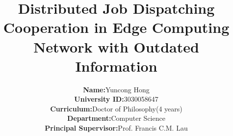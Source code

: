 \documentclass[journal, 12pt, onecolumn, draftclsnofoot]{IEEEtran} %
\theoremstyle{definition}             %
\theoremstyle{remark}                 %
\theoremstyle{plain}                  %
\begin{document}
    \title{
        Distributed Job Dispatching Cooperation in Edge Computing Network with Outdated Information
    }

    \author{
        \begin{tabular}{rl}
            \textbf{Name: }&                Yuncong Hong \\
            \textbf{University ID:}&        3030058647 \\
            \textbf{Curriculum:}&           Doctor of Philosophy(4 years) \\
            \textbf{Department:}&           Computer Science \\
            \textbf{Principal Supervisor:}& Prof. Francis C.M. Lau
        \end{tabular}
    }

    \maketitle

    
    

    
    

    
    
    
    

    
    

\end{document}
